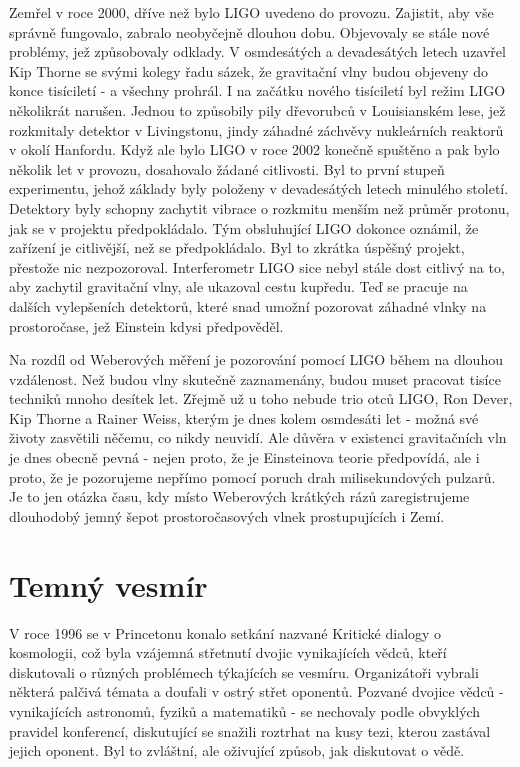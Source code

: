   Zemřel v roce 2000, dříve než bylo LIGO uvedeno do provozu. Zajistit, aby vše správně fungovalo,
  zabralo neobyčejně dlouhou dobu. Objevovaly se stále nové problémy, jež způsobovaly odklady. V
  osmdesátých a devadesátých letech uzavřel Kip Thorne se svými kolegy řadu sázek, že gravitační
  vlny budou objeveny do konce tisíciletí - a všechny prohrál. I na začátku nového tisíciletí byl
  režim LIGO několikrát narušen. Jednou to způsobily pily dřevorubců v Louisianském lese, jež
  rozkmitaly detektor v Livingstonu, jindy záhadné záchvěvy nukleárních reaktorů v okolí Hanfordu.
  Když ale bylo LIGO v roce 2002 konečně spuštěno a pak bylo několik let v provozu, dosahovalo
  žádané citlivosti. Byl to první stupeň experimentu, jehož základy byly položeny v devadesátých
  letech minulého století. Detektory byly schopny zachytit vibrace o rozkmitu menším než průměr
  protonu, jak se v projektu předpokládalo. Tým obsluhující LIGO dokonce oznámil, že zařízení je
  citlivější, než se předpokládalo. Byl to zkrátka úspěšný projekt, přestože nic nezpozoroval.
  Interferometr LIGO sice nebyl stále dost citlivý na to, aby zachytil gravitační vlny, ale ukazoval
  cestu kupředu. Teď se pracuje na dalších vylepšeních detektorů, které snad umožní pozorovat
  záhadné vlnky na prostoročase, jež Einstein kdysi předpověděl. 
  
  Na rozdíl od Weberových měření je pozorování pomocí LIGO během na dlouhou vzdálenost. Než budou
  vlny skutečně zaznamenány, budou muset pracovat tisíce techniků mnoho desítek let. Zřejmě už u
  toho nebude trio otců LIGO, Ron Dever, Kip Thorne a Rainer Weiss, kterým je dnes kolem osmdesáti
  let - možná své životy zasvětili něčemu, co nikdy neuvidí. Ale důvěra v existenci gravitačních vln
  je dnes obecně pevná - nejen proto, že je Einsteinova teorie předpovídá, ale i proto, že je
  pozorujeme nepřímo pomocí poruch drah milisekundových pulzarů. Je to jen otázka času, kdy místo
  Weberových krátkých rázů zaregistrujeme dlouhodobý jemný šepot prostoročasových vlnek
  prostupujících i Zemí.

\section{Temný vesmír}\label{feyIchIIIsecXII}
  V roce 1996 se v Princetonu konalo setkání nazvané Kritické dialogy o kosmologii, což byla
  vzájemná střetnutí dvojic vynikajících vědců, kteří diskutovali o různých problémech týkajících se
  vesmíru. Organizátoři vybrali některá palčivá témata a doufali v ostrý střet oponentů. Pozvané
  dvojice vědců - vynikajících astronomů, fyziků a matematiků - se nechovaly podle obvyklých
  pravidel konferencí, diskutující se snažili roztrhat na kusy tezi, kterou zastával jejich oponent.
  Byl to zvláštní, ale oživující způsob, jak diskutovat o vědě. 
  
